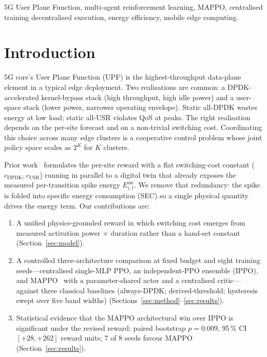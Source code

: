\documentclass[journal]{IEEEtran}
\begin{document}
\begin{IEEEkeywords}
5G User Plane Function, multi-agent reinforcement learning, MAPPO,
centralised training decentralised execution, energy efficiency,
mobile edge computing.
\end{IEEEkeywords}


\section{Introduction}
 5G core's User Plane Function (UPF) is the
highest-throughput data-plane element in a typical edge deployment.
Two realisations are common: a DPDK-accelerated kernel-bypass stack
(high throughput, high idle power) and a user-space stack (lower
power, narrower operating envelope). Static all-DPDK wastes energy
at low load; static all-USR violates QoS at peaks. The right
realisation depends on the per-site forecast and on a non-trivial
switching cost. Coordinating this choice across many edge clusters
is a cooperative control problem whose joint policy space scales as
$2^K$ for $K$ clusters.

Prior work~\cite{ref:comcom} formulates the per-site reward with a
flat switching-cost constant ($c_{\mathrm{DPDK}}, c_{\mathrm{USR}}$)
running in parallel to a digital twin that already exposes the
measured per-transition spike energy $E^{\mathrm{sw}}_{i,t}$. We
remove that redundancy: the spike is folded into specific energy
consumption (SEC) so a single physical quantity drives the energy
term. Our contributions are:

\begin{enumerate}
\item A unified physics-grounded reward in which switching cost
emerges from measured activation power $\times$ duration rather than
a hand-set constant (Section~\ref{sec:model}).
\item A controlled three-architecture comparison at fixed budget and
eight training seeds---centralised single-MLP PPO, an independent-PPO
ensemble (IPPO), and MAPPO~\cite{ref:mappo} with a parameter-shared
actor and a centralised critic---against three classical baselines
(always-DPDK; derived-threshold; hysteresis swept over five band
widths) (Sections~\ref{sec:method}--\ref{sec:results}).
\item Statistical evidence that the MAPPO architectural win over
IPPO is significant under the revised reward: paired bootstrap
$p\!=\!0.009$, 95\,\% CI $[+28,+262]$ reward units; 7 of 8 seeds
favour MAPPO (Section~\ref{sec:results}).
\end{enumerate}
\end{document}
